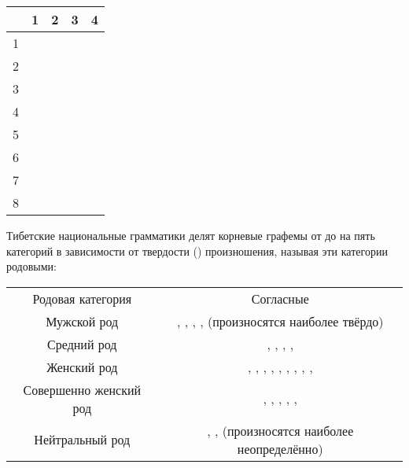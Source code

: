 \begin{tabularx}{\textwidth}{|C{1}|C{1}|C{1}|C{1}|C{1}|}
	\caption{Корневые графемы тибетского языка}\label{tab:1}
	\\
		\hline
	 & 1 & 2 & 3 & 4\\
	 &  \toneR &  \toneR &  \toneV &  \toneV \\
	2 &  \toneR &  \toneR &  \toneV &  \toneV \\
	3 &  \toneR &  \toneR &  \toneV &  \toneV \\
	4 &  \toneR &  \toneR &  \toneV &  \toneV \\
	5 &  \toneR &  \toneR &  \toneV &  \toneV \\
	6 &  \toneV &  \toneV &  \toneV &  \toneV \\
	7 &  \toneV &  \toneV &  \toneR &  \toneR \\
	8 &  \toneR &  & & \\
	\hline
\end{tabularx}

Тибетские национальные грамматики делят корневые графемы от  до  на пять категорий в зависимости от твердости () произношения, называя эти категории родовыми:

\begin{tabularx}{\textwidth}{C{1}|C{1}}
	Родовая категория & Согласные\\
	Мужской род  & , , , ,  (произносятся наиболее твёрдо)\\
	Средний род  & , , , , \\
	Женский род  & , , , , , , , , , \\
	Совершенно женский род  & , , , , , \\
	Нейтральный род  & , ,  (произносятся наиболее неопределённо)
\end{tabularx}

